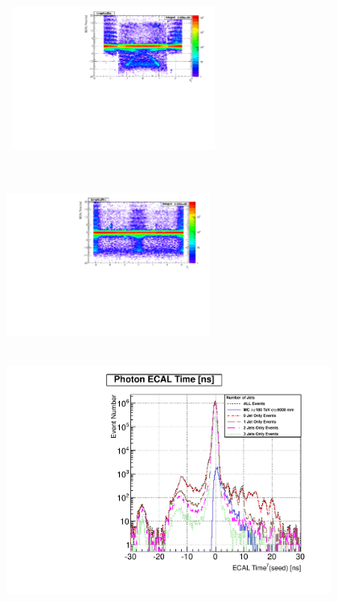\begin{center}
\centering
\mbox{
\includegraphics[height=6cm, width=0.5\textwidth]{THESISPLOTS/SinglePhotonDataSet-TimeVsEta.pdf}
\includegraphics[height=6cm, width=0.5\textwidth]{THESISPLOTS/SinglePhotonDataSet-TimeVsPhi.pdf}}
\includegraphics[height=8cm, width=0.8\textwidth]{THESISPLOTS/Photon_SeedXtalTime_Distribution_VsJetMultiplicity.pdf}
\label{fig:BKGPLOTS}
\end{center}
